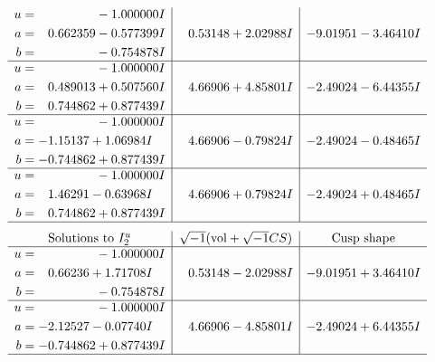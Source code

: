 \documentclass[1p]{elsarticle_modified}
\theoremstyle{definition}
\newcommand{\I}{\sqrt{-1}}
\begin{document}
$$\begin{array}{c|c|c}
\begin{aligned}
u &= \phantom{-0.000000 } -1.000000 I \\
a &= \phantom{-}0.662359 - 0.577399 I \\
b &= \phantom{-0.000000 } -0.754878 I\end{aligned}
 & \phantom{-}0.53148 + 2.02988 I & -9.01951 - 3.46410 I \\ \hline\begin{aligned}
u &= \phantom{-0.000000 } -1.000000 I \\
a &= \phantom{-}0.489013 + 0.507560 I \\
b &= \phantom{-}0.744862 + 0.877439 I\end{aligned}
 & \phantom{-}4.66906 + 4.85801 I & -2.49024 - 6.44355 I \\ \hline\begin{aligned}
u &= \phantom{-0.000000 } -1.000000 I \\
a &= -1.15137 + 1.06984 I \\
b &= -0.744862 + 0.877439 I\end{aligned}
 & \phantom{-}4.66906 - 0.79824 I & -2.49024 - 0.48465 I \\ \hline\begin{aligned}
u &= \phantom{-0.000000 } -1.000000 I \\
a &= \phantom{-}1.46291 - 0.63968 I \\
b &= \phantom{-}0.744862 + 0.877439 I\end{aligned}
 & \phantom{-}4.66906 + 0.79824 I & -2.49024 + 0.48465 I\\
 \hline 
 \end{array}$$\newpage$$\begin{array}{c|c|c}  
\text{Solutions to }I^u_{2}& \I (\text{vol} + \sqrt{-1}CS) & \text{Cusp shape}\\
 \hline 
\begin{aligned}
u &= \phantom{-0.000000 } -1.000000 I \\
a &= \phantom{-}0.66236 + 1.71708 I \\
b &= \phantom{-0.000000 } -0.754878 I\end{aligned}
 & \phantom{-}0.53148 - 2.02988 I & -9.01951 + 3.46410 I \\ \hline\begin{aligned}
u &= \phantom{-0.000000 } -1.000000 I \\
a &= -2.12527 - 0.07740 I \\
b &= -0.744862 + 0.877439 I\end{aligned}
 & \phantom{-}4.66906 - 4.85801 I & -2.49024 + 6.44355 I\\
 \hline 
 \end{array}$$\newpage
\end{document}
